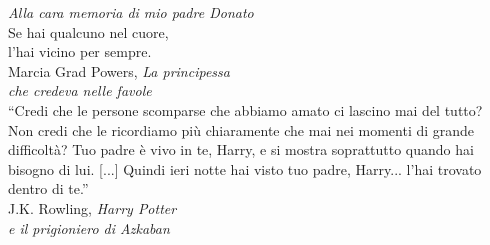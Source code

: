 \cleardoublepage
    \thispagestyle{empty}
            \begin{flushright}
                \textit{Alla cara memoria di mio padre Donato} \\ \vspace{5mm}
                         Se hai qualcuno nel cuore, \\
                         l'hai vicino per sempre. \\ \vspace{1.5mm}
                        \footnotesize Marcia Grad Powers, \textit{La principessa \\ che credeva nelle favole} \\ \vspace{5mm}
                        \normalsize “Credi che le persone scomparse che abbiamo amato ci lascino mai del tutto? Non credi 
                        che le ricordiamo più chiaramente che mai nei momenti di grande difficoltà? Tuo padre è vivo in te, Harry, e 
                        si mostra soprattutto quando hai bisogno di lui. [...] Quindi ieri notte hai visto tuo padre, Harry... 
                        l'hai trovato dentro di te.”\\ \vspace{1.5mm}
                \footnotesize J.K. Rowling, \textit{Harry Potter \\ e il prigioniero di Azkaban}
            \end{flushright}
\cleardoublepage
